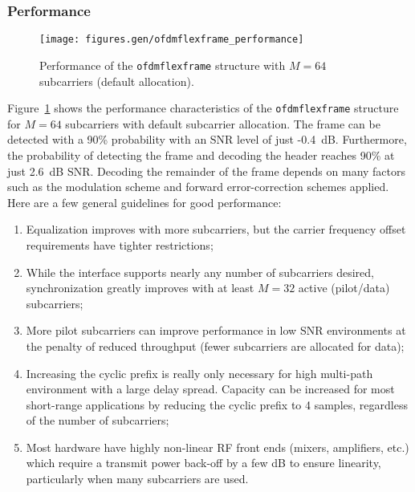 \subsubsection{Performance}
\label{module:framing:ofdmflexframe:performance}
%

% 
%
\begin{figure}
\centering
  \texttt{[image: figures.gen/ofdmflexframe\_performance]}
\caption{Performance of the {\tt ofdmflexframe} structure with
         $M=64$ subcarriers (default allocation).}
\label{fig:module:framing:ofdmflexframe_performance}
\end{figure}
%
Figure~\ref{fig:module:framing:ofdmflexframe_performance} shows the
performance characteristics of the {\tt ofdmflexframe} structure for
$M=64$ subcarriers with default subcarrier allocation.
The frame can be detected with a 90\% probability with an SNR level of
just -0.4~dB.
Furthermore, the probability of detecting the frame and decoding the
header reaches 90\% at just 2.6~dB SNR.
Decoding the remainder of the frame depends on many factors such as the
modulation scheme and forward error-correction schemes applied.
%
Here are a few general guidelines for good performance:
\begin{enumerate}
\item Equalization improves with more subcarriers, but the carrier
      frequency offset requirements have tighter restrictions;
\item While the interface supports nearly any number of subcarriers
      desired, synchronization greatly improves with at least $M=32$
      active (pilot/data) subcarriers;
\item More pilot subcarriers can improve performance in low SNR 
      environments at the penalty of reduced throughput
      (fewer subcarriers are allocated for data);
\item Increasing the cyclic prefix is really only necessary for high
      multi-path environment with a large delay spread.
      Capacity can be increased for most short-range applications by
      reducing the cyclic prefix to 4 samples, regardless of the number
      of subcarriers;
\item Most hardware have highly non-linear RF front ends (mixers,
      amplifiers, etc.) which require a transmit power back-off by a few
      dB to ensure linearity, particularly when many subcarriers are
      used.
\end{enumerate}
%
